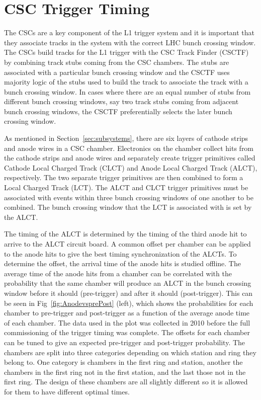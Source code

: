\section{CSC Trigger Timing \label{sec:trigtime}}

The CSCs are a key component of the L1 trigger system and it is important that they associate tracks in the system with the correct LHC bunch crossing window.
The CSCs build tracks for the L1 trigger with the CSC Track Finder (CSCTF)~\cite{2003physics...6117A} by combining track stubs coming from the CSC chambers. 
The stubs are associated with a particular bunch crossing window and
the CSCTF uses majority logic of the stubs used to build the track to associate the track with a bunch crossing window. In cases where there are an equal number
of stubs from different bunch crossing windows, say two track stubs coming from adjacent bunch crossing windows, the CSCTF preferentially selects the later bunch crossing window.

As mentioned in Section~\ref{sec:subsystems}, there are six layers of cathode strips and anode wires in a CSC chamber.
Electronics on the chamber collect hits from the cathode strips and anode wires and separately create trigger primitives called Cathode Local Charged Track (CLCT)
and Anode Local Charged Track (ALCT), respectively. The two separate trigger primitives are then combined to form a Local Charged Track (LCT). The ALCT and CLCT trigger primitives
must be associated with events within three bunch crossing windows of one another to be combined.
The bunch crossing window that the LCT is associated with is set by the ALCT.

The timing of the ALCT is determined by the timing of the third anode hit 
to arrive to the ALCT circuit board. A common offset per chamber can be applied to the
anode hits to give the best timing synchronization of the ALCTs. To determine the offset, the arrival time of the anode hits is studied offline. The average time of the anode
hits from a chamber can be correlated with the probability that the same chamber will produce an ALCT in the bunch crossing 
window before it should (pre-trigger) and after it should (post-trigger).
This can be seen in Fig~\ref{fig:AnodevsprePost} (left), which shows the probabilities for each chamber to pre-trigger and post-trigger as a function of the average
anode time of each chamber. The data used in the plot was collected in 2010 before the full commissioning of the trigger timing was complete.
The offsets for each chamber can be tuned to give an expected pre-trigger and post-trigger probability.
The chambers are split into three categories depending on which station and ring they belong to. One category is chambers in the
first ring and station, another the chambers in the first ring not in the first station, and the last those not in the first ring. The design of these chambers are all
slightly different so it is allowed for them to have different optimal times.

